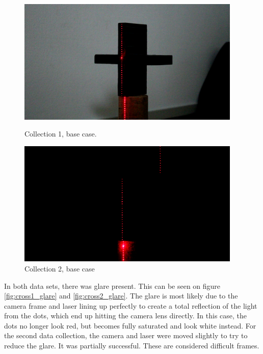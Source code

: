 \begin{figure}[h!]
    \centering
    \begin{minipage}[t]{0.48\textwidth}
        \centering
        \includegraphics[width=0.95\textwidth]{figures/ImageAnalysis/cross1_base.png}
        \caption{Collection 1, base case.}
    \label{fig:cross1_base}
    \end{minipage}%
    \hspace{.03\textwidth}
    \begin{minipage}[t]{0.48\textwidth}
        \centering
        \includegraphics[width=0.95\textwidth]{figures/ImageAnalysis/cross2_base.png}
        \caption{Collection 2, base case}
        \label{fig:cross2_base}
    \end{minipage}
\end{figure}
\FloatBarrier
In both data sets, there was glare present. This can be seen on figure \ref{fig:cross1_glare} and \ref{fig:cross2_glare}. The glare is most likely due to the camera frame and laser lining up perfectly to create a total reflection of the light from the dots, which end up hitting the camera lens directly. In this case, the dots no longer look red, but becomes fully saturated and look white instead. For the second data collection, the camera and laser were moved slightly to try to reduce the glare. It was partially successful. These are considered difficult frames.
